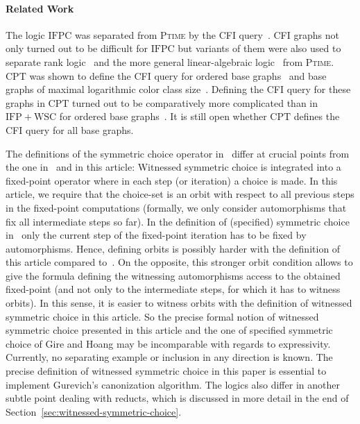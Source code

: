 \documentclass[]{lmcs}
\newcommand{\PTime}{\textsc{Ptime}}
\newcommand{\CPT}{\ensuremath{\mathrm{CPT}}}
\newcommand{\IFPWSC}{\ensuremath{\mathrm{IFP{+}WSC}}}
\newcommand{\IFPC}{\ensuremath{\mathrm{IFPC}}}
\begin{document}
\paragraph{Related Work}
The logic \IFPC{} was separated from \PTime{}
by the CFI query~\cite{CaiFI1992}.
CFI graphs not only turned out to be difficult for \IFPC{}
but variants of them were also used to separate rank logic~\cite{Lichter2023}
and the more general linear-algebraic logic~\cite{DawarGraedelLichter22} from \PTime{}.
\CPT{} was shown to define the CFI query for 
ordered base graphs~\cite{DawarRicherbyRossman2008}
and base graphs of maximal logarithmic color class size~\cite{PakusaSchalthoeferSelman2016}.
Defining the CFI query for these graphs in \CPT{}
turned out to be comparatively more complicated
than in \IFPWSC{} for ordered base graphs~\cite{GireHoang98}.
It is still open whether \CPT{} defines the CFI query for all base graphs.

The definitions of the symmetric choice operator
in~\cite{GireHoang98, DawarRicherby03}
differ at crucial points from the one in~\cite{LichterSchweitzer24} and in this article:
Witnessed symmetric choice is integrated into a fixed-point operator
where in each step (or iteration) a choice is made.
In this article, we require that the choice-set is an orbit with respect to all previous steps in the fixed-point computations (formally, we only consider automorphisms that fix all intermediate steps so far).
In the definition of (specified) symmetric choice in~\cite{GireHoang98, DawarRicherby03}
only the current step of the fixed-point iteration has to be fixed by automorphisms.
Hence, defining orbits is possibly harder with the definition of this article compared to~\cite{GireHoang98, DawarRicherby03}.
On the opposite, this stronger orbit condition
allows to give the formula defining the witnessing automorphisms
access to the obtained fixed-point (and not only to the intermediate steps, for which it has to witness orbits).
In this sense, it is easier to witness orbits with the definition of witnessed symmetric choice in this article.
So the precise formal notion of witnessed symmetric choice presented in this article and the one of specified symmetric choice of Gire and Hoang may be incomparable with regards to expressivity.
Currently, no separating example or inclusion in any direction is known.
The precise definition of witnessed symmetric choice in this paper
is essential to implement Gurevich's canonization algorithm.
The logics also differ in another subtle point dealing with reducts,
which is discussed in more detail in the end of Section~\ref{sec:witnessed-symmetric-choice}.
\end{document}
